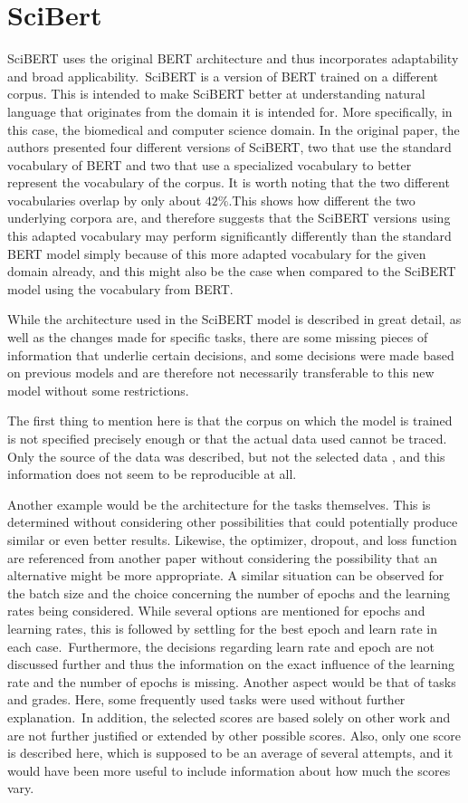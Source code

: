 \chapter{SciBert}
SciBERT uses the original BERT architecture and thus incorporates adaptability and broad applicability.\cite{Beltagy2019,Devlin2018} SciBERT is a version of BERT trained on a different corpus. This is intended to make SciBERT better at understanding natural language that originates from the domain it is intended for. More specifically, in this case, the biomedical and computer science domain. In the original paper, the authors presented four different versions of SciBERT, two that use the standard vocabulary of BERT and two that use a specialized vocabulary to better represent the vocabulary of the corpus. It is worth noting that the two different vocabularies overlap by only about $42\%$.This shows how different the two underlying corpora are, and therefore suggests that the SciBERT versions using this adapted vocabulary may perform significantly differently than the standard BERT model simply because of this more adapted vocabulary for the given domain already, and this might also be the case when compared to the SciBERT model using the vocabulary from BERT. \cite{Beltagy2019}

While the architecture used in the SciBERT model is described in great detail, as well as the changes made for specific tasks, there are some missing pieces of information that underlie certain decisions, and some decisions were made based on previous models and are therefore not necessarily transferable to this new model without some restrictions.

The first thing to mention here is that the corpus on which the model is trained is not specified precisely enough or that the actual data used cannot be traced.  Only the source of the data was described, but not the selected data \cite{Beltagy2019}, and this information does not seem to be reproducible at all.

Another example would be the architecture for the tasks themselves. This is determined without considering other possibilities that could potentially produce similar or even better results. Likewise, the optimizer, dropout, and loss function are referenced from another paper without considering the possibility that an alternative might be more appropriate. A similar situation can be observed for the batch size and the choice concerning the number of epochs and the learning rates being considered. While several options are mentioned for epochs and learning rates, this is followed by settling for the best epoch and learn rate in each case. Furthermore, the decisions regarding learn rate and epoch are not discussed further and thus the information on the exact influence of the learning rate and the number of epochs is missing.
Another aspect would be that of tasks and grades. Here, some frequently used tasks were used without further explanation. In addition, the selected scores are based solely on other work and are not further justified or extended by other possible scores. Also, only one score is described here, which is supposed to be an average of several attempts, and it would have been more useful to include information about how much the scores vary.  


